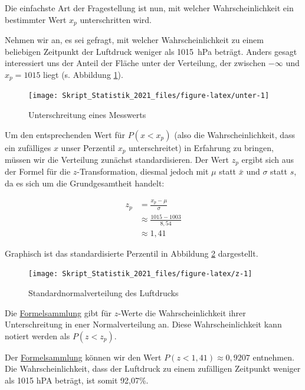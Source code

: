 \documentclass[
  11pt,
  ngerman,
  a4paper,
]{report}
\begin{document}
Die einfachste Art der Fragestellung ist nun, mit welcher Wahrscheinlichkeit ein bestimmter Wert \(x_p\) unterschritten wird.

Nehmen wir an, es sei gefragt, mit welcher Wahrscheinlichkeit zu einem beliebigen Zeitpunkt der Luftdruck weniger als 1015~hPa beträgt. Anders gesagt interessiert uns der Anteil der Fläche unter der Verteilung, der zwischen \(-\infty\) und \(x_p=1015\) liegt (s. Abbildung \ref{fig:unter}).

\begin{figure}[H]

{\centering \texttt{[image: Skript\_Statistik\_2021\_files/figure-latex/unter-1]} 

}

\caption{Unterschreitung eines Messwerts}\label{fig:unter}
\end{figure}

Um den entsprechenden Wert für \(P(x < x_p)\) (also die Wahrscheinlichkeit, dass ein zufälliges \(x\) unser Perzentil \(x_p\) unterschreitet) in Erfahrung zu bringen, müssen wir die Verteilung zunächst standardisieren. Der Wert \(z_p\) ergibt sich aus der Formel für die \(z\)-Transformation, diesmal jedoch mit \(\mu\) statt \(\bar{x}\) und \(\sigma\) statt \(s\), da es sich um die Grundgesamtheit handelt:

\[\begin{aligned}
    z_p &= \frac{x_p-\mu}{\sigma} \\[4pt]
        &\approx \frac{1015-1003}{8{,}54}\\[4pt]
        &\approx 1{,}41
  \end{aligned}
\]

Graphisch ist das standardisierte Perzentil in Abbildung \ref{fig:z} dargestellt.

\begin{figure}[H]

{\centering \texttt{[image: Skript\_Statistik\_2021\_files/figure-latex/z-1]} 

}

\caption{Standardnormalverteilung des Luftdrucks}\label{fig:z}
\end{figure}

Die \href{Formelsammlung\%20und\%20Wertetabellen.pdf}{Formelsammlung} gibt für \(z\)-Werte die Wahrscheinlichkeit ihrer Unterschreitung in ener Normalverteilung an. Diese Wahrscheinlichkeit kann notiert werden als \(P(z<z_p)\).

Der \href{Formelsammlung\%20und\%20Wertetabellen.pdf}{Formelsammlung} können wir den Wert \(P(z < 1,41) \approx 0,9207\) entnehmen. Die Wahrscheinlichkeit, dass der Luftdruck zu einem zufälligen Zeitpunkt weniger als 1015 hPA beträgt, ist somit 92,07\%.
\end{document}
